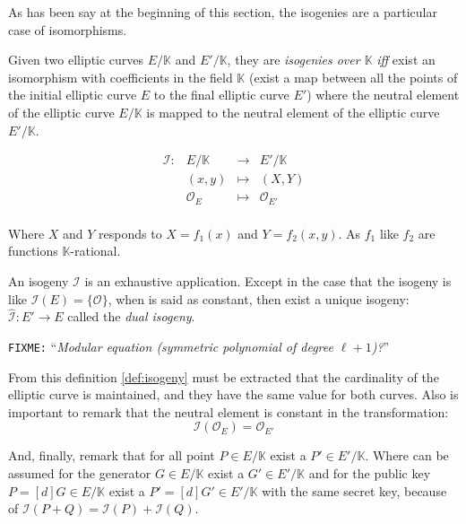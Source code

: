 \documentclass[10pt,a4paper,twoside]{llncs}
\newcommand{\fixme}[1]{\texttt{\color{red}FIXME:} ``\emph{#1}''}
\newcommand{\PaIe}{\ensuremath{\mathcal{O}_{E}}}%
\begin{document}
As has been say at the beginning of this section, the isogenies are a particular case of isomorphisms.

\begin{definition}\label{def:isogeny}
 Given two elliptic curves $E/\mathbb{K}$ and $E'/\mathbb{K}$, they are \emph{isogenies over $\mathbb{K}$} \emph{iff} exist an isomorphism with coefficients in the field $\mathbb{K}$ (exist a map between all the points of the initial elliptic curve $E$ to the final elliptic curve $E'$) where the neutral element of the elliptic curve $E/\mathbb{K}$ is mapped to the neutral element of the elliptic curve $E'/\mathbb{K}$.

\begin{equation}\label{eq:isogenia}
        \begin{array}{cccc}
                \mathcal{I}: & E/\mathbb{K} & \rightarrow & E'/\mathbb{K} \\
                \;           & (x,y)        & \mapsto     & (X,Y) \\
                \;           & \mathcal{O}_{E} & \mapsto  & \mathcal{O}_{E'} \\
        \end{array}
\end{equation}

Where $X$ and $Y$ responds to $X=f_{1}(x)$ and $Y=f_{2}(x,y)$. As $f_{1}$ like $f_{2}$ are functions $\mathbb{K}$-rational.
\end{definition}

An isogeny $\mathcal{I}$ is an exhaustive application. Except in the case that the isogeny is like $\mathcal{I}(E)=\{\mathcal{O}\}$, when is said as constant, then exist a unique isogeny: $\widehat{\mathcal{I}}:E' \rightarrow E$ called the \emph{dual isogeny}.

\fixme{Modular equation (symmetric polynomial of degree $\ell+1$)?}

From this definition \ref{def:isogeny} must be extracted that the cardinality of the elliptic curve is maintained, and they have the same value for both curves. Also is important to remark that the neutral element is constant in the transformation:
 \begin{equation}\label{eq:isoPaI}
        \mathcal{I}\left(\PaIe\right) = \mathcal{O}_{E'}
\end{equation}

And, finally, remark that for all point $P \in E/\mathbb{K}$ exist a $P' \in E'/\mathbb{K}$. Where can be assumed for the generator $G \in E/\mathbb{K}$ exist a $G' \in E'/\mathbb{K}$ and for the public key $P=[d]G \in E/\mathbb{K}$ exist a $P'=[d]G' \in E'/\mathbb{K}$ with the same secret key, because of $\mathcal{I}\left(P+Q\right) = \mathcal{I}\left(P\right)+\mathcal{I}\left(Q\right)$.
\end{document}
